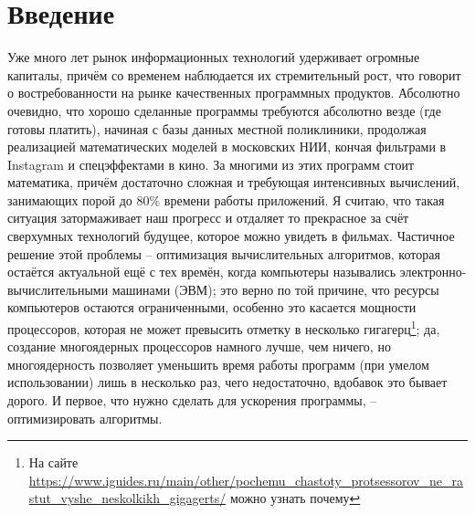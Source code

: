 \documentclass[a4paper, 12pt]{article}
\begin{document}
\section*{Введение}

Уже много лет рынок информационных технологий удерживает огромные капиталы, причём со временем наблюдается их стремительный рост, что говорит о востребованности на рынке качественных программных продуктов. Абсолютно очевидно, что хорошо сделанные программы требуются абсолютно везде (где готовы платить), начиная с базы данных местной поликлиники, продолжая реализацией математических моделей в московских НИИ, кончая фильтрами в Instagram и спецэффектами в кино.
За многими из этих программ стоит математика, причём достаточно сложная и требующая интенсивных вычислений, занимающих порой до 80\% времени работы приложений.
Я считаю, что такая ситуация затормаживает наш прогресс и отдаляет то прекрасное за счёт сверхумных технологий будущее, которое можно увидеть в фильмах.
Частичное решение этой проблемы – оптимизация вычислительных алгоритмов, которая остаётся актуальной ещё с тех времён, когда компьютеры назывались электронно-вычислительными машинами (ЭВМ);
это верно по той причине, что ресурсы компьютеров остаются ограниченными, особенно это касается мощности процессоров, которая не может превысить отметку в несколько гигагерц\footnote{На сайте \url{https://www.iguides.ru/main/other/pochemu_chastoty_protsessorov_ne_rastut_vyshe_neskolkikh_gigagerts/} можно узнать почему}; да, создание многоядерных процессоров намного лучше, чем ничего, но многоядерность позволяет уменьшить время работы программ (при умелом использовании) лишь в несколько раз, чего недостаточно, вдобавок это бывает дорого.
И первое, что нужно сделать для ускорения программы, -- оптимизировать алгоритмы.
\end{document}
